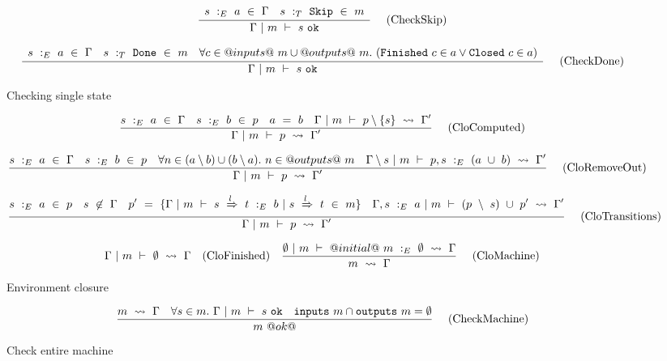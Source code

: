 \begin{figure*}
$$
\frac {\displaystyle 
    \begin{array}{lr}
        s~:_E~ a ~\in~ \Gamma                &
        s ~:_T~ \mathtt{Skip} ~\in~m
    \end{array}
} {\displaystyle  
    \Gamma ~|~ m ~\vdash~ s~\mathtt{ok}
} \ 
\quad
\textrm{(CheckSkip)}
$$

$$
\frac {\displaystyle 
    \begin{array}{lcr}
        s~:_E~ a ~\in~ \Gamma                &
        s ~:_T~ \mathtt{Done} ~\in~m    &
        \forall c \in @inputs@~m \cup @outputs@~m.~(\mathtt{Finished}~c \in a \vee \mathtt{Closed}~c \in a)
    \end{array}
} {\displaystyle  
    \Gamma ~|~ m ~\vdash~ s~\mathtt{ok}
} \ 
\quad
\textrm{(CheckDone)}
$$

\caption{Checking single state}
\label{fig:inv:checking}
\end{figure*}

\begin{figure*}

$$
\frac {\displaystyle 
    s~:_E~ a ~\in~ \Gamma
    \quad
    s~:_E~b~\in~p
    \quad
    a~=~b
    \quad
    \Gamma ~|~ m ~\vdash~ p \setminus \{s\} ~\rightsquigarrow~ \Gamma'
} {\displaystyle 
    \Gamma ~|~ m ~\vdash~ p ~\rightsquigarrow~ \Gamma'
} \ 
\quad
\textrm{(CloComputed)}
$$

$$
\frac {\displaystyle 
    s~:_E~ a ~\in~ \Gamma
    \quad
    s~:_E~b~\in~p
    \quad
    \forall n \in (a \setminus b) \cup (b \setminus a).~ n \in @outputs@~m
    \quad
    \Gamma \setminus s ~|~ m ~\vdash~ p, s~:_E~(a~\cup~b) ~\rightsquigarrow~ \Gamma'
} {\displaystyle 
    \Gamma ~|~ m ~\vdash~ p ~\rightsquigarrow~ \Gamma'
} \ 
\quad
\textrm{(CloRemoveOut)}
$$

$$
\frac {\displaystyle 
    s~:_E~a~\in~p
    \quad
    s~\not\in~\Gamma
    \quad
    p'~=~\{ \Gamma ~|~ m ~\vdash~ s~\xRightarrow{l}~t ~:_E~ b ~|~ s~\xRightarrow{l}~ t~\in~ m\}
    \quad
    \Gamma,s~:_E~a ~|~ m ~\vdash~ (p~\setminus~s)~\cup~ p'  ~\rightsquigarrow~ \Gamma'
} {\displaystyle 
    \Gamma ~|~ m ~\vdash~ p ~\rightsquigarrow~ \Gamma'
} \ 
\quad
\textrm{(CloTransitions)}
$$

$$
\Gamma ~|~ m ~\vdash~ \emptyset ~\rightsquigarrow~ \Gamma
\quad
\textrm{(CloFinished)}
\quad
\frac {\displaystyle 
    \emptyset ~|~ m ~\vdash~ @initial@~m~:_E~\emptyset ~\rightsquigarrow~ \Gamma
} {\displaystyle 
    m ~\rightsquigarrow~ \Gamma
} \ 
\quad
\textrm{(CloMachine)}
$$

\caption{Environment closure}
\label{fig:inv:closure}
\end{figure*}


\begin{figure*}

$$
\frac {\displaystyle 
    m ~\rightsquigarrow~ \Gamma
    \quad
    \forall s \in m.\ \Gamma ~|~ m ~\vdash~ s~\mathtt{ok}
    \quad
    \mathtt{inputs}~m \cap \mathtt{outputs}~m = \emptyset
} {\displaystyle 
    m~@ok@
} \ 
\quad
\textrm{(CheckMachine)}
$$


\caption{Check entire machine}
\label{fig:inv:entire}
\end{figure*}
